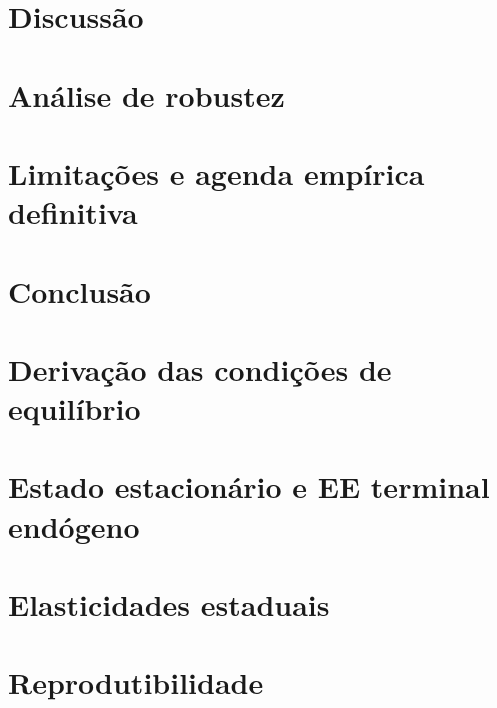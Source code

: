 \documentclass[12pt,a4paper]{article}
\newcommand{\fonte}[1]{\vspace{0.05cm}\captionsetup{font=scriptsize}\caption*{\footnotesize Fonte: #1}}
\begin{document}
\section{Discuss\~ao}

\section{An\'alise de robustez}

\section{Limita\c{c}\~oes e agenda emp\'irica definitiva}\label{sec:agenda}

\section{Conclus\~ao}


\appendix
\section{Deriva\c{c}\~ao das condi\c{c}\~oes de equil\'ibrio}\label{ap:deriv}

\section{Estado estacion\'ario e EE terminal end\'ogeno}\label{ap:ss}

\section{Elasticidades estaduais}\label{ap:elast}
\begin{table}[H]
\centering
\caption{Elasticidade sal\'ario-educa\c{c}\~ao por UF: bruta (\emph{bootstrap}) e encolhida (EB)}
\label{tab:elastuf}
\scriptsize

\fonte{Elabora\c{c}\~ao pr\'opria a partir de 2.000 reamostragens.}
\end{table}

\section{Reprodutibilidade}\label{ap:repro}
\end{document}
